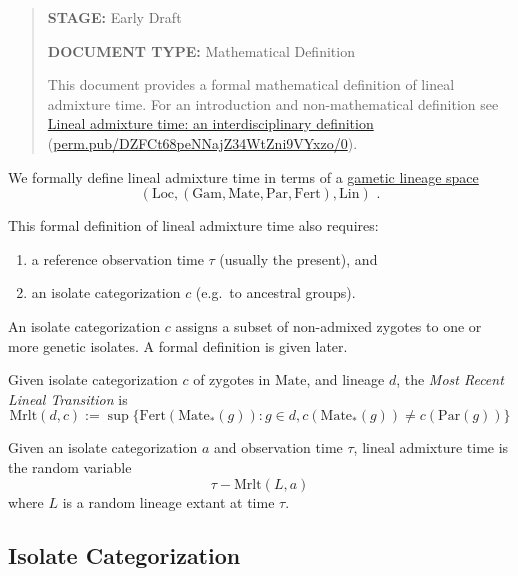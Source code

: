 


\newcommand{\dom}[1]{\operatorname{dom}{ #1}}
\newcommand{\stop}{\text{ .}}

\newcommand{\Gam}{\mathrm{Gam}}
\newcommand{\Loc}{\mathrm{Loc}}
\newcommand{\Lin}{\mathrm{Lin}}
\newcommand{\Mate}{\mathrm{Mate}}
\newcommand{\Par}{\mathrm{Par}}
\newcommand{\Fert}{\mathrm{Fert}}
\newcommand{\Mrlt}{\mathrm{Mrlt}}


\begin{abstract}
\textbf{STAGE:} Early Draft

\textbf{DOCUMENT TYPE:} Mathematical Definition

This document provides a formal mathematical definition of lineal
admixture time. For an introduction and non-mathematical definition see
\href{https://perm.pub/DZFCt68peNNajZ34WtZni9VYxzo/0}{Lineal admixture time: an interdisciplinary definition}
(\href{https://perm.pub/DZFCt68peNNajZ34WtZni9VYxzo/0}{perm.pub/DZFCt68peNNajZ34WtZni9VYxzo/0}).
\end{abstract}


We formally define lineal admixture time in terms of a
\href{https://popgen.es/0iV47kWzQAuyONrIDG538k3x3Qc/0.3/}{gametic
lineage space}
\cite{dsi:0i/0.3}
\[
(\Loc, (\Gam, \Mate, \Par, \Fert), \Lin)
\stop
\]

This formal definition of lineal admixture time also requires:

\begin{enumerate}
\def\labelenumi{\arabic{enumi}.}
\tightlist
\item
  a reference observation time \(\tau\) (usually the present), and
\item
  an isolate categorization \(c\) (e.g.~to ancestral groups).
\end{enumerate}

An isolate categorization \(c\) assigns a subset of non-admixed zygotes
to one or more genetic isolates. A formal definition is given later.

Given isolate categorization \(c\) of zygotes in \(\Mate\), and lineage
\(d\), the \emph{Most Recent Lineal Transition} is \[
\Mrlt(d,c) := \sup\{ \Fert(\Mate_*(g)) : g \in d, c(\Mate_*(g)) \not= c(\Par(g)) \}
\]

Given an isolate categorization \(a\) and observation time \(\tau\),
lineal admixture time is the random variable \[
\tau - \Mrlt(L, a)
\] where \(L\) is a random lineage extant at time \(\tau\).

\hypertarget{isolate-categorization}{%
\subsection{Isolate Categorization}\label{isolate-categorization}}

